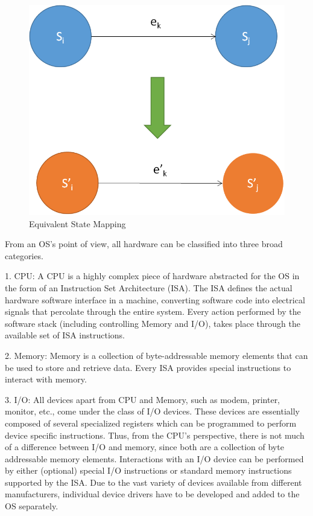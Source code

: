 \begin{figure}[H]
  \centering
  \includegraphics[scale=0.8]{figures/vir_phy_map.png}
  \caption[Equivalent State Mapping]{Equivalent State Mapping \cite{smith_nair}}
  \label{fig:statemap}
\end{figure}

From an OS's point of view, all hardware can be classified into three broad categories.

1. CPU: A CPU is a highly complex piece of hardware abstracted for the OS in the form of an Instruction Set Architecture (ISA). The ISA defines the actual hardware software interface in a machine, converting software code into electrical signals that percolate through the entire system. Every action performed by the software stack (including controlling Memory and I/O), takes place through the available set of ISA instructions.

2. Memory: Memory is a collection of byte-addressable memory elements that can be used to store and retrieve data. Every ISA provides special instructions to interact with memory.

3. I/O: All devices apart from CPU and Memory, such as modem, printer, monitor, etc., come under the class of I/O devices. These devices are essentially composed of several specialized registers which can be programmed to perform device specific instructions. Thus, from the CPU’s perspective, there is not much of a difference between I/O and memory, since both are a collection of byte addressable memory elements. Interactions with an I/O device can be performed by either (optional) special I/O instructions or standard memory instructions supported by the ISA. Due to the vast variety of devices available from different manufacturers, individual device drivers have to be developed and added to the OS separately.


